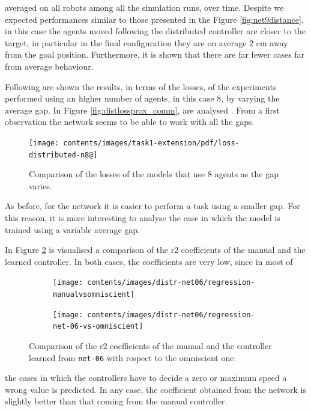\noindent
 averaged on all robots among all the simulation runs, over time. 
Despite we expected performances similar to those presented in the Figure 
\ref{fig:net9distance}, in this case the agents moved following the distributed 
controller are closer to the target, in particular in the final configuration they 
are 
on average $2$ \gls{cm} away from the goal position. 
Furthermore, it is shown that there are far fewer cases far from average 
behaviour.

Following are shown the results, in terms of the losses, of the experiments 
performed using an higher number of agents, in this case 8, by varying the 
average gap.
In Figure \ref{fig:distlossprox_comm}, are analysed  . From a first observation 
the 
network seems to be able to work with all the gaps.
\begin{figure}[!htb]
	\centering
	\texttt{[image: contents/images/task1-extension/pdf/loss-distributed-n8@]}%
	\caption{Comparison of the losses of the models that use $8$ agents as 
	the gap 
	varies.}
	\label{fig:distlossn8}
\end{figure}
As before, for the network it is easier to perform a task using a smaller gap.
For this reason, it is more interesting to analyse the case in which the model 
is trained using a variable average gap.

In Figure \ref{fig:net06r2} is visualised a comparison of the \gls{r2} 
coefficients of the manual and the learned controller. In both cases, the 
coefficients are very low, since in most of
\begin{figure}[!htb]
	\centering
	\begin{subfigure}[h]{0.49\textwidth}
		\centering
		\texttt{[image: contents/images/distr-net06/regression-manualvsomniscient]}%
	\end{subfigure}
	\hfill
	\begin{subfigure}[h]{0.49\textwidth}
		\centering
		\texttt{[image: contents/images/distr-net06/regression-net-06-vs-omniscient]}
	\end{subfigure}
	\caption[Evaluation of the \gls{r2} coefficients of \texttt{net-06} 
	.]{Comparison of the \gls{r2} coefficients of the manual and the controller 
	learned from \texttt{net-06} with respect to the omniscient one.}
	\label{fig:net06r2}
\end{figure}

\noindent
the cases in which the controllers have to decide a zero or maximum speed a 
wrong value is predicted.
In any case, the coefficient obtained from the network is slightly better than 
that coming from the manual controller.

